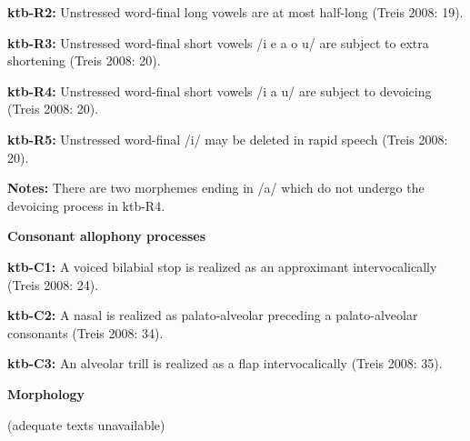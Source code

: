 \begin{styleBody}
\textbf{ktb-R2: }Unstressed word-final long vowels are at most half-long (Treis 2008: 19).
\end{styleBody}

\begin{styleBody}
\textbf{ktb-R3: }Unstressed word-final short vowels /i e a o u/ are subject to extra shortening (Treis 2008: 20).
\end{styleBody}

\begin{styleBody}
\textbf{ktb-R4: }Unstressed word-final short vowels /i a u/ are subject to devoicing (Treis 2008: 20).
\end{styleBody}

\begin{styleBody}
\textbf{ktb-R5: }Unstressed word-final /i/ may be deleted in rapid speech (Treis 2008: 20).
\end{styleBody}

\begin{styleBody}
\textbf{Notes: }There are two morphemes ending in /a/ which do not undergo the devoicing process in ktb-R4.
\end{styleBody}

\begin{styleBody}
\textbf{Consonant allophony processes}
\end{styleBody}

\begin{styleBody}
\textbf{ktb-C1:} A voiced bilabial stop is realized as an approximant intervocalically (Treis 2008: 24).
\end{styleBody}

\begin{styleBody}
\textbf{ktb-C2:} A nasal is realized as palato-alveolar preceding a palato-alveolar consonants (Treis 2008: 34).
\end{styleBody}

\begin{styleBody}
\textbf{ktb-C3:} An alveolar trill is realized as a flap intervocalically (Treis 2008: 35).
\end{styleBody}

\begin{styleBody}
\textbf{Morphology}
\end{styleBody}

\begin{styleBody}
(adequate texts unavailable)
\end{styleBody}

